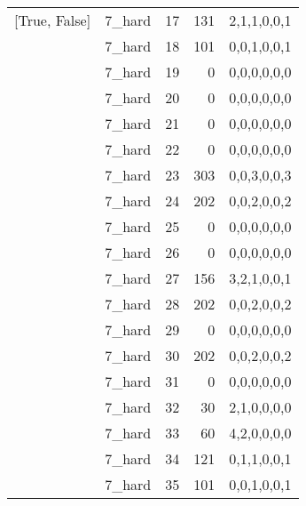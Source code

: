 \begin{tabular}{llrrl}
 [True, False]   & 7\_hard              &            17 &                   131 & 2,1,1,0,0,1   \\
 [True, False]   & 7\_hard              &            18 &                   101 & 0,0,1,0,0,1   \\
 [True, False]   & 7\_hard              &            19 &                     0 & 0,0,0,0,0,0   \\
 [True, False]   & 7\_hard              &            20 &                     0 & 0,0,0,0,0,0   \\
 [True, False]   & 7\_hard              &            21 &                     0 & 0,0,0,0,0,0   \\
 [True, False]   & 7\_hard              &            22 &                     0 & 0,0,0,0,0,0   \\
 [True, False]   & 7\_hard              &            23 &                   303 & 0,0,3,0,0,3   \\
 [True, False]   & 7\_hard              &            24 &                   202 & 0,0,2,0,0,2   \\
 [True, False]   & 7\_hard              &            25 &                     0 & 0,0,0,0,0,0   \\
 [True, False]   & 7\_hard              &            26 &                     0 & 0,0,0,0,0,0   \\
 [True, False]   & 7\_hard              &            27 &                   156 & 3,2,1,0,0,1   \\
 [True, False]   & 7\_hard              &            28 &                   202 & 0,0,2,0,0,2   \\
 [True, False]   & 7\_hard              &            29 &                     0 & 0,0,0,0,0,0   \\
 [True, False]   & 7\_hard              &            30 &                   202 & 0,0,2,0,0,2   \\
 [True, False]   & 7\_hard              &            31 &                     0 & 0,0,0,0,0,0   \\
 [True, False]   & 7\_hard              &            32 &                    30 & 2,1,0,0,0,0   \\
 [True, False]   & 7\_hard              &            33 &                    60 & 4,2,0,0,0,0   \\
 [True, False]   & 7\_hard              &            34 &                   121 & 0,1,1,0,0,1   \\
 [True, False]   & 7\_hard              &            35 &                   101 & 0,0,1,0,0,1   \\

\end{tabular}
